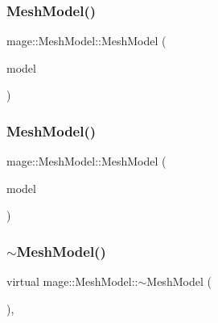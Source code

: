 \subsubsection{\texorpdfstring{Mesh\+Model()}{MeshModel()}\hspace{0.1cm}{\footnotesize\ttfamily [2/3]}}
{\footnotesize\ttfamily mage\+::\+Mesh\+Model\+::\+Mesh\+Model (\begin{DoxyParamCaption}\item[{const \hyperlink{classmage_1_1_mesh_model}{Mesh\+Model} \&}]{model }\end{DoxyParamCaption})\hspace{0.3cm}{\ttfamily [default]}}

\hypertarget{classmage_1_1_mesh_model_af7e00b17aa7c20bd575cf276c3d1e32e}{}\label{classmage_1_1_mesh_model_af7e00b17aa7c20bd575cf276c3d1e32e} 
\subsubsection{\texorpdfstring{Mesh\+Model()}{MeshModel()}\hspace{0.1cm}{\footnotesize\ttfamily [3/3]}}
{\footnotesize\ttfamily mage\+::\+Mesh\+Model\+::\+Mesh\+Model (\begin{DoxyParamCaption}\item[{\hyperlink{classmage_1_1_mesh_model}{Mesh\+Model} \&\&}]{model }\end{DoxyParamCaption})\hspace{0.3cm}{\ttfamily [default]}}

\hypertarget{classmage_1_1_mesh_model_a5e918737b966842a31381ef6c00ca6d2}{}\label{classmage_1_1_mesh_model_a5e918737b966842a31381ef6c00ca6d2} 
\subsubsection{\texorpdfstring{$\sim$\+Mesh\+Model()}{~MeshModel()}}
{\footnotesize\ttfamily virtual mage\+::\+Mesh\+Model\+::$\sim$\+Mesh\+Model (\begin{DoxyParamCaption}{ }\end{DoxyParamCaption})\hspace{0.3cm}{\ttfamily [virtual]}, {\ttfamily [default]}}



